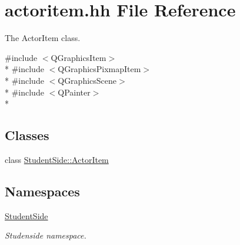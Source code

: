 \hypertarget{actoritem_8hh}{\section{actoritem.\-hh File Reference}
\label{actoritem_8hh}
}


The Actor\-Item class.  


{\ttfamily \#include $<$Q\-Graphics\-Item$>$}\\*
{\ttfamily \#include $<$Q\-Graphics\-Pixmap\-Item$>$}\\*
{\ttfamily \#include $<$Q\-Graphics\-Scene$>$}\\*
{\ttfamily \#include $<$Q\-Painter$>$}\\*
\subsection*{Classes}
\begin{DoxyCompactItemize}
\item 
class \hyperlink{class_student_side_1_1_actor_item}{Student\-Side\-::\-Actor\-Item}
\end{DoxyCompactItemize}
\subsection*{Namespaces}
\begin{DoxyCompactItemize}
\item 
\hyperlink{namespace_student_side}{Student\-Side}
\begin{DoxyCompactList}\small\item\em Studenside namespace. \end{DoxyCompactList}\end{DoxyCompactItemize}
